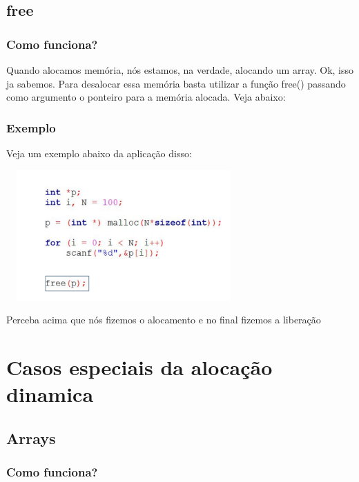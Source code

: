 \documentclass{report}
\begin{document}
	
	\subsection{free}
	\subsubsection{Como funciona?}
	
	Quando alocamos memória, nós estamos, na verdade, alocando um array. Ok, isso ja sabemos. Para desalocar essa memória basta utilizar a função free() passando como argumento o ponteiro para a memória alocada. Veja abaixo:
	

	
	
	
	\subsubsection{Exemplo}
	Veja um exemplo abaixo da aplicação disso:
	
	\begin{center}
		
		\includegraphics[width=9cm,height=5cm,keepaspectratio=false]{imagens/free.png}
		
	\end{center}
	
	Perceba acima que nós fizemos o alocamento e no final fizemos a liberação
	
	
	
	\section{Casos especiais da alocação dinamica}
	\subsection{Arrays}
	
	\subsubsection{Como funciona?}
	
\end{document}
